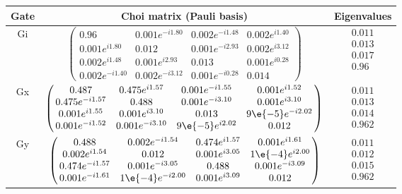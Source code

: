 {\begin{table}[h]
\begin{center}
\begin{tabular}[l]{|c|c|c|}
\hline
Gate & Choi matrix (Pauli basis) & Eigenvalues \\ \hline
Gi & $ \left(\!\!\begin{array}{cccc}
0.96 & 0.001e^{-i1.80} & 0.002e^{-i1.48} & 0.002e^{i1.40} \\ 
0.001e^{i1.80} & 0.012 & 0.001e^{-i2.93} & 0.002e^{i3.12} \\ 
0.002e^{i1.48} & 0.001e^{i2.93} & 0.013 & 0.001e^{i0.28} \\ 
0.002e^{-i1.40} & 0.002e^{-i3.12} & 0.001e^{-i0.28} & 0.014
 \end{array}\!\!\right) $
 & $ \begin{array}{c}
0.011 \\ 
0.013 \\ 
0.017 \\ 
0.96
 \end{array} $
 \\ \hline
Gx & $ \left(\!\!\begin{array}{cccc}
0.487 & 0.475e^{i1.57} & 0.001e^{-i1.55} & 0.001e^{i1.52} \\ 
0.475e^{-i1.57} & 0.488 & 0.001e^{-i3.10} & 0.001e^{i3.10} \\ 
0.001e^{i1.55} & 0.001e^{i3.10} & 0.013 & 9\e{-5}e^{-i2.02} \\ 
0.001e^{-i1.52} & 0.001e^{-i3.10} & 9\e{-5}e^{i2.02} & 0.012
 \end{array}\!\!\right) $
 & $ \begin{array}{c}
0.011 \\ 
0.013 \\ 
0.014 \\ 
0.962
 \end{array} $
 \\ \hline
Gy & $ \left(\!\!\begin{array}{cccc}
0.488 & 0.002e^{-i1.54} & 0.474e^{i1.57} & 0.001e^{i1.61} \\ 
0.002e^{i1.54} & 0.012 & 0.001e^{i3.05} & 1\e{-4}e^{i2.00} \\ 
0.474e^{-i1.57} & 0.001e^{-i3.05} & 0.488 & 0.001e^{-i3.09} \\ 
0.001e^{-i1.61} & 1\e{-4}e^{-i2.00} & 0.001e^{i3.09} & 0.012
 \end{array}\!\!\right) $
 & $ \begin{array}{c}
0.011 \\ 
0.012 \\ 
0.015 \\ 
0.962
 \end{array} $
 \\ \hline
\end{tabular}


\end{center}
\end{table}}
